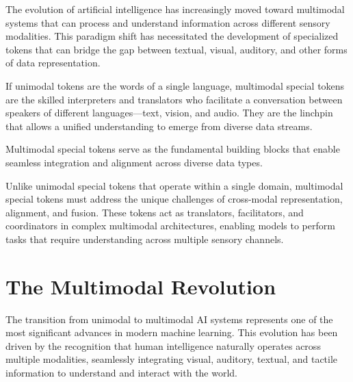 
The evolution of artificial intelligence has increasingly moved toward multimodal systems that can process and understand information across different sensory modalities. This paradigm shift has necessitated the development of specialized tokens that can bridge the gap between textual, visual, auditory, and other forms of data representation.

If unimodal tokens are the words of a single language, multimodal special tokens are the skilled interpreters and translators who facilitate a conversation between speakers of different languages—text, vision, and audio. They are the linchpin that allows a unified understanding to emerge from diverse data streams.

Multimodal special tokens serve as the fundamental building blocks that enable seamless integration and alignment across diverse data types.

\begin{comment}
Feedback: This is a strong opening. To make it even more engaging, you could use a metaphor to explain the role of these tokens. For example: "If unimodal tokens are the words of a single language, multimodal special tokens are the skilled interpreters and translators who facilitate a conversation between speakers of different languages—text, vision, and audio. They are the linchpin that allows a unified understanding to emerge from diverse data streams."

STATUS: addressed - added interpreter/translator metaphor to make the role of multimodal tokens more engaging
\end{comment}

Unlike unimodal special tokens that operate within a single domain, multimodal special tokens must address the unique challenges of cross-modal representation, alignment, and fusion. These tokens act as translators, facilitators, and coordinators in complex multimodal architectures, enabling models to perform tasks that require understanding across multiple sensory channels.

\section{The Multimodal Revolution}

The transition from unimodal to multimodal AI systems represents one of the most significant advances in modern machine learning. This evolution has been driven by the recognition that human intelligence naturally operates across multiple modalities, seamlessly integrating visual, auditory, textual, and tactile information to understand and interact with the world.

